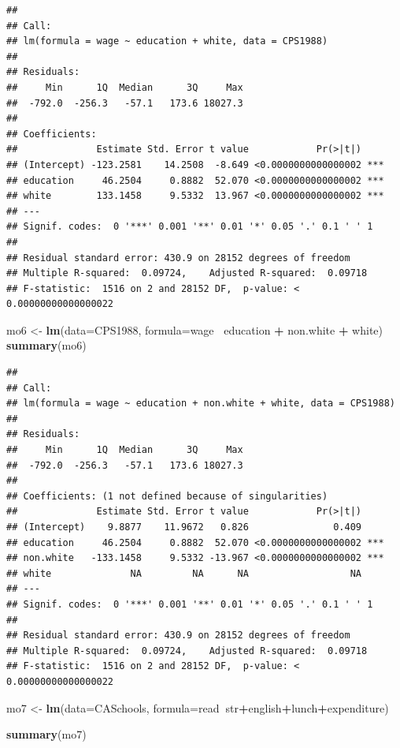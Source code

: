 \documentclass[
]{book}
\newenvironment{Shaded}{\begin{snugshade}}{\end{snugshade}}
\newcommand{\DataTypeTok}[1]{\textcolor[rgb]{0.13,0.29,0.53}{#1}}
\newcommand{\KeywordTok}[1]{\textcolor[rgb]{0.13,0.29,0.53}{\textbf{#1}}}
\newcommand{\NormalTok}[1]{#1}
\newcommand{\OperatorTok}[1]{\textcolor[rgb]{0.81,0.36,0.00}{\textbf{#1}}}
\newcommand{\StringTok}[1]{\textcolor[rgb]{0.31,0.60,0.02}{#1}}
\begin{document}
\begin{verbatim}
## 
## Call:
## lm(formula = wage ~ education + white, data = CPS1988)
## 
## Residuals:
##     Min      1Q  Median      3Q     Max 
##  -792.0  -256.3   -57.1   173.6 18027.3 
## 
## Coefficients:
##              Estimate Std. Error t value            Pr(>|t|)    
## (Intercept) -123.2581    14.2508  -8.649 <0.0000000000000002 ***
## education     46.2504     0.8882  52.070 <0.0000000000000002 ***
## white        133.1458     9.5332  13.967 <0.0000000000000002 ***
## ---
## Signif. codes:  0 '***' 0.001 '**' 0.01 '*' 0.05 '.' 0.1 ' ' 1
## 
## Residual standard error: 430.9 on 28152 degrees of freedom
## Multiple R-squared:  0.09724,    Adjusted R-squared:  0.09718 
## F-statistic:  1516 on 2 and 28152 DF,  p-value: < 0.00000000000000022
\end{verbatim}

\begin{Shaded}
\begin{Highlighting}[]
\NormalTok{mo6 <-}\StringTok{  }\KeywordTok{lm}\NormalTok{(}\DataTypeTok{data=}\NormalTok{CPS1988, }\DataTypeTok{formula=}\NormalTok{wage}\OperatorTok{~}\StringTok{ }\NormalTok{education }\OperatorTok{+}\StringTok{ }\NormalTok{non.white }\OperatorTok{+}\StringTok{ }\NormalTok{white)}
\KeywordTok{summary}\NormalTok{(mo6)}
\end{Highlighting}
\end{Shaded}

\begin{verbatim}
## 
## Call:
## lm(formula = wage ~ education + non.white + white, data = CPS1988)
## 
## Residuals:
##     Min      1Q  Median      3Q     Max 
##  -792.0  -256.3   -57.1   173.6 18027.3 
## 
## Coefficients: (1 not defined because of singularities)
##              Estimate Std. Error t value            Pr(>|t|)    
## (Intercept)    9.8877    11.9672   0.826               0.409    
## education     46.2504     0.8882  52.070 <0.0000000000000002 ***
## non.white   -133.1458     9.5332 -13.967 <0.0000000000000002 ***
## white              NA         NA      NA                  NA    
## ---
## Signif. codes:  0 '***' 0.001 '**' 0.01 '*' 0.05 '.' 0.1 ' ' 1
## 
## Residual standard error: 430.9 on 28152 degrees of freedom
## Multiple R-squared:  0.09724,    Adjusted R-squared:  0.09718 
## F-statistic:  1516 on 2 and 28152 DF,  p-value: < 0.00000000000000022
\end{verbatim}

\begin{Shaded}
\begin{Highlighting}[]
\NormalTok{mo7 <-}\StringTok{ }\KeywordTok{lm}\NormalTok{(}\DataTypeTok{data=}\NormalTok{CASchools, }\DataTypeTok{formula=}\NormalTok{read}\OperatorTok{~}\NormalTok{str}\OperatorTok{+}\NormalTok{english}\OperatorTok{+}\NormalTok{lunch}\OperatorTok{+}\NormalTok{expenditure)}

\KeywordTok{summary}\NormalTok{(mo7)}
\end{Highlighting}
\end{Shaded}
\end{document}
